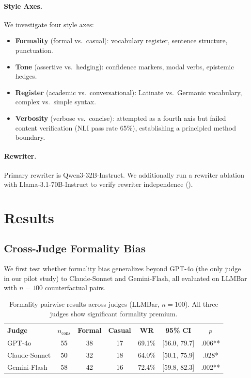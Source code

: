 \documentclass[11pt,a4paper]{article}
\begin{document}
\paragraph{Style Axes.}
We investigate four style axes:
\begin{itemize}
    \item \textbf{Formality} (formal vs.\ casual): vocabulary register, sentence structure, punctuation.
    \item \textbf{Tone} (assertive vs.\ hedging): confidence markers, modal verbs, epistemic hedges.
    \item \textbf{Register} (academic vs.\ conversational): Latinate vs.\ Germanic vocabulary, complex vs.\ simple syntax.
    \item \textbf{Verbosity} (verbose vs.\ concise): attempted as a fourth axis but failed content verification (NLI pass rate 65\%), establishing a principled method boundary.
\end{itemize}

\paragraph{Rewriter.}
Primary rewriter is Qwen3-32B-Instruct.
We additionally run a rewriter ablation with Llama-3.1-70B-Instruct to verify rewriter independence ().

\section{Results}

\subsection{Cross-Judge Formality Bias}
\label{sec:crossjudge}

We first test whether formality bias generalizes beyond GPT-4o (the only judge in our pilot study) to Claude-Sonnet and Gemini-Flash, all evaluated on LLMBar with $n=100$ counterfactual pairs.

\begin{table}[t]
\centering
\small
\caption{Formality pairwise results across judges (LLMBar, $n=100$). All three judges show significant formality premium.}
\label{tab:formality-judges}
\begin{tabular}{lcccccc}
\toprule
\textbf{Judge} & $n_\text{cons}$ & \textbf{Formal} & \textbf{Casual} & \textbf{WR} & \textbf{95\% CI} & \textbf{$p$} \\
\midrule
GPT-4o        & 55 & 38 & 17 & 69.1\% & [56.0, 79.7] & .006** \\
Claude-Sonnet & 50 & 32 & 18 & 64.0\% & [50.1, 75.9] & .028*  \\
Gemini-Flash  & 58 & 42 & 16 & 72.4\% & [59.8, 82.3] & .002** \\
\bottomrule
\end{tabular}
\end{table}
\end{document}
